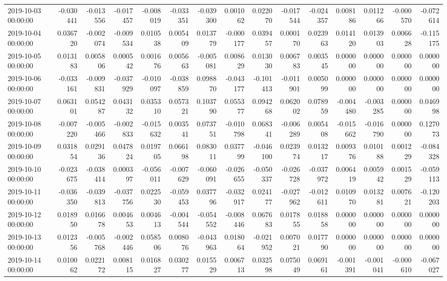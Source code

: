 \begin{tabular}{lrrrrrrrrrrrrrr}
2019-10-03 00:00:00 & -0.030441 & -0.013556 & -0.017457 & -0.008019 & -0.033351 & -0.039300 & 0.001062 & 0.022070 & -0.017544 & -0.024357 & 0.008186 & 0.011266 & -0.000570 & -0.072614 \\
2019-10-04 00:00:00 & 0.036720 & -0.002074 & -0.009534 & 0.010538 & 0.005409 & 0.013779 & -0.000177 & 0.039457 & 0.000170 & 0.023963 & 0.014120 & 0.013903 & 0.006628 & -0.115175 \\
2019-10-05 00:00:00 & 0.013183 & 0.005806 & 0.000542 & 0.001676 & 0.005663 & -0.005081 & 0.008629 & 0.013030 & 0.006783 & 0.003545 & 0.000000 & 0.000000 & 0.000000 & 0.000000 \\
2019-10-06 00:00:00 & -0.033161 & -0.009831 & -0.037929 & -0.010097 & -0.038859 & 0.098870 & -0.043177 & -0.101413 & -0.011901 & 0.005099 & 0.000000 & 0.000000 & 0.000000 & 0.000000 \\
2019-10-07 00:00:00 & 0.063101 & 0.054287 & 0.043132 & 0.035310 & 0.057321 & 0.103790 & 0.055377 & 0.094268 & 0.062002 & 0.078959 & -0.004480 & -0.003285 & 0.000000 & 0.046998 \\
2019-10-08 00:00:00 & -0.007220 & -0.005466 & -0.002833 & -0.015632 & 0.003541 & 0.073751 & -0.010798 & 0.068341 & -0.006289 & 0.005408 & -0.015662 & -0.016790 & 0.000000 & 0.127073 \\
2019-10-09 00:00:00 & 0.031854 & 0.029136 & 0.047824 & 0.019705 & 0.066198 & 0.083011 & 0.037799 & -0.046100 & 0.023974 & 0.013217 & 0.009376 & 0.010188 & 0.001229 & -0.084328 \\
2019-10-10 00:00:00 & -0.023675 & -0.038414 & 0.000397 & -0.056011 & -0.007629 & -0.060091 & -0.026655 & -0.050337 & -0.026728 & -0.037972 & 0.006419 & 0.005942 & 0.001529 & -0.059113 \\
2019-10-11 00:00:00 & -0.036350 & -0.039813 & -0.037756 & 0.022530 & -0.059453 & 0.037796 & -0.032917 & 0.024177 & -0.027962 & -0.012611 & 0.010970 & 0.013281 & 0.007621 & -0.120203 \\
2019-10-12 00:00:00 & 0.018950 & 0.016678 & 0.004653 & 0.004613 & -0.004544 & -0.054552 & -0.008446 & 0.067683 & 0.017855 & 0.018858 & 0.000000 & 0.000000 & 0.000000 & 0.000000 \\
2019-10-13 00:00:00 & 0.012356 & -0.005768 & -0.002446 & 0.058506 & 0.008076 & -0.043963 & 0.018064 & -0.021952 & 0.007021 & 0.017790 & 0.000000 & 0.000000 & 0.000000 & 0.000000 \\
2019-10-14 00:00:00 & 0.010062 & 0.022172 & 0.008115 & 0.016827 & 0.030277 & 0.015529 & 0.006713 & 0.032598 & 0.075049 & 0.069161 & -0.001391 & -0.001041 & -0.000610 & -0.067027 \\

\end{tabular}

